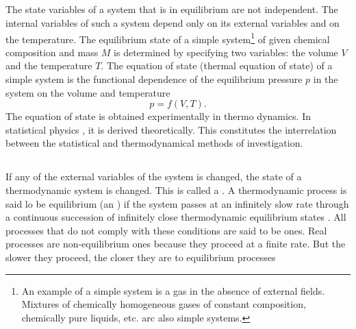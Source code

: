 \subsection{}\label{8.3.6} The state variables of a system that is in equilibrium  are not independent. The internal variables of such a system depend only on its external variables and on the temperature. The equilibrium state of a simple system\footnote{An example of a simple system is a gas in the absence of external fields. Mixtures of chemically homogeneous gases of constant composition, chemically pure liquids, etc. arc also simple systems.} of given chemical composition and mass $M$ is determined by specifying two variables: the volume $V$ and the temperature $T$. The equation of state (thermal equation of state) of a simple system is the functional dependence of the equilibrium pressure $p$ in the system on the volume and temperature
\begin{equation*}%
p= f(V, T).
\end{equation*}
The equation of state is obtained experimentally in thermo­ dynamics. In statistical physics , it is derived theoret­ically. This constitutes the interrelation between the statis­tical  and thermodynamical  methods of investi­gation.

\subsection{}\label{8.3.7} If any of the external variables of the system is changed, the state of a thermodynamic system is changed. This is called a . A thermodynamic process is said lo be equilibrium (an ) if the system passes at an infinitely slow rate through a continuous succession of infinitely close thermodynamic equilibrium states . All processes that do not comply with these conditions are said to be  ones. Real processes are non-equilibrium ones because they proceed at a finite rate. But the slower they proceed, the closer they are to equilibrium processes

